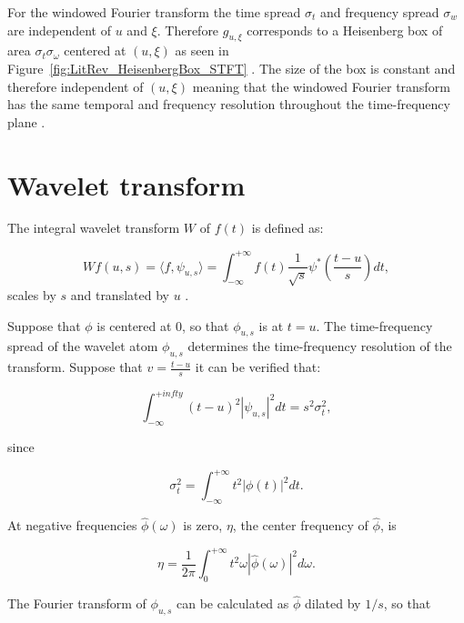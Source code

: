 For the windowed Fourier transform the time spread $\sigma_t$ and frequency spread $\sigma_w$ are independent of $u$ and $\xi$. Therefore $g_{u,\xi}$ corresponds to a Heisenberg box of area $\sigma_t \sigma_\omega$ centered at $(u,\xi)$ as seen in Figure~\ref{fig:LitRev_HeisenbergBox_STFT} \cite{Heisenberg1927}. The size of the box is constant and therefore independent of $(u,\xi)$ meaning that the windowed Fourier transform has the same temporal and frequency resolution throughout the time-frequency plane \cite{Mallat1999}.

\section{Wavelet transform}\label{ap:TimeFreqResolutionWavelet}
The integral wavelet transform $W$ of $f(t)$ is defined as:

\begin{equation}\label{eq:Mallat1999_xcopy}
W f(u,s) = \langle f, \psi_{u,s} \rangle = \int^{+\infty}_{-\infty} f(t) \frac{1}{\sqrt{s}}\psi^\ast \left( \frac{t-u}{s} \right) dt,
\end{equation}
scales by $s$ and translated by $u$ \cite{Mallat1999}.

Suppose that $\phi$ is centered at 0, so that $\phi_{u,s}$ is at $t=u$. The time-frequency spread of the wavelet atom $\phi_{u,s}$ determines the time-frequency resolution of the transform. Suppose that $v = \frac{t-u}{s}$ it can be verified that:

\begin{equation}\label{eq:Mallat1999_451}
\int^{+infty}_{-\infty} (t - u)^2 |\psi_{u,s} |^2  dt = s^2 \sigma^2_t,
\end{equation}

since

\begin{equation}\label{eq:Mallat1999_4515}
\sigma_t^2 = \int^{+\infty}_{-\infty}t^2 |\phi(t)|^2 dt.
\end{equation}

At negative frequencies $\hat{\phi}(\omega)$ is zero, $\eta$, the center frequency of $\hat{\phi}$, is

\begin{equation}\label{eq:Mallat1999_452}
\eta = \frac{1}{2\pi} \int^{+\infty}_{0}t^2 \omega |\hat{\phi}(\omega)|^2 d\omega.
\end{equation}

The Fourier transform of $\phi_{u,s}$ can be calculated as $\hat{\phi}$ dilated by $1/s$, so that

